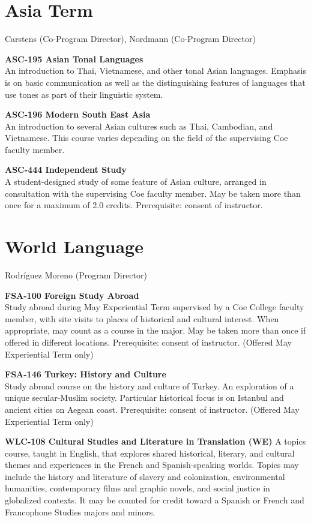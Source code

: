 \documentclass[
  letterpaper,
]{scrbook}
\begin{document}
\section{Asia Term}\label{asia-term-1}

Carstens (Co-Program Director), Nordmann (Co-Program Director)

\textbf{ASC-195 Asian Tonal Languages}\\
An introduction to Thai, Vietnamese, and other tonal Asian languages.
Emphasis is on basic communication as well as the distinguishing
features of languages that use tones as part of their linguistic system.

\textbf{ASC-196 Modern South East Asia}\\
An introduction to several Asian cultures such as Thai, Cambodian, and
Vietnamese. This course varies depending on the field of the supervising
Coe faculty member.

\textbf{ASC-444 Independent Study}\\
A student-designed study of some feature of Asian culture, arranged in
consultation with the supervising Coe faculty member. May be taken more
than once for a maximum of 2.0 credits. Prerequisite: consent of
instructor.

\section{World Language}\label{world-language}

Rodríguez Moreno (Program Director)

\textbf{FSA-100 Foreign Study Abroad}\\
Study abroad during May Experiential Term supervised by a Coe College
faculty member, with site visits to places of historical and cultural
interest. When appropriate, may count as a course in the major. May be
taken more than once if offered in different locations. Prerequisite:
consent of instructor. (Offered May Experiential Term only)

\textbf{FSA-146 Turkey: History and Culture}\\
Study abroad course on the history and culture of Turkey. An exploration
of a unique secular-Muslim society. Particular historical focus is on
Istanbul and ancient cities on Aegean coast. Prerequisite: consent of
instructor. (Offered May Experiential Term only)

\textbf{WLC-108 Cultural Studies and Literature in Translation (WE)} A
topics course, taught in English, that explores shared historical,
literary, and cultural themes and experiences in the French and
Spanish-speaking worlds. Topics may include the history and literature
of slavery and colonization, environmental humanities, contemporary
films and graphic novels, and social justice in globalized contexts. It
may be counted for credit toward a Spanish or French and Francophone
Studies majors and minors.
\end{document}
